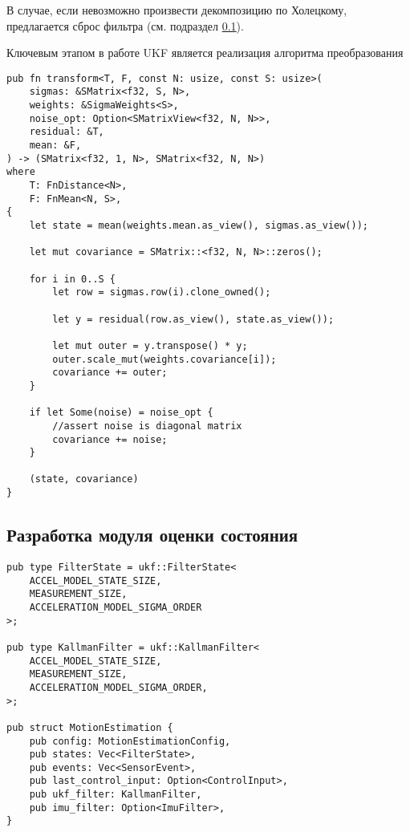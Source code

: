 В случае, если невозможно произвести декомпозицию по Холецкому,
предлагается сброс фильтра (см. подраздел \ref{subsec:motion_estimation}).

Ключевым этапом в работе UKF является реализация алгоритма преобразования  

\begin{lstlisting}
pub fn transform<T, F, const N: usize, const S: usize>(
    sigmas: &SMatrix<f32, S, N>,
    weights: &SigmaWeights<S>,
    noise_opt: Option<SMatrixView<f32, N, N>>,
    residual: &T,
    mean: &F,
) -> (SMatrix<f32, 1, N>, SMatrix<f32, N, N>)
where
    T: FnDistance<N>,
    F: FnMean<N, S>,
{
    let state = mean(weights.mean.as_view(), sigmas.as_view());

    let mut covariance = SMatrix::<f32, N, N>::zeros();

    for i in 0..S {
        let row = sigmas.row(i).clone_owned();

        let y = residual(row.as_view(), state.as_view());

        let mut outer = y.transpose() * y;
        outer.scale_mut(weights.covariance[i]);
        covariance += outer;
    }

    if let Some(noise) = noise_opt {
        //assert noise is diagonal matrix
        covariance += noise;
    }

    (state, covariance)
}
\end{lstlisting}

\subsection{Разработка модуля оценки состояния}
\label{subsec:motion_estimation}

\begin{lstlisting}
pub type FilterState = ukf::FilterState<
    ACCEL_MODEL_STATE_SIZE,
    MEASUREMENT_SIZE,
    ACCELERATION_MODEL_SIGMA_ORDER
>;

pub type KallmanFilter = ukf::KallmanFilter<
    ACCEL_MODEL_STATE_SIZE,
    MEASUREMENT_SIZE,
    ACCELERATION_MODEL_SIGMA_ORDER,
>;

pub struct MotionEstimation {
    pub config: MotionEstimationConfig,
    pub states: Vec<FilterState>,
    pub events: Vec<SensorEvent>,
    pub last_control_input: Option<ControlInput>,
    pub ukf_filter: KallmanFilter,
    pub imu_filter: Option<ImuFilter>,
}
\end{lstlisting}

